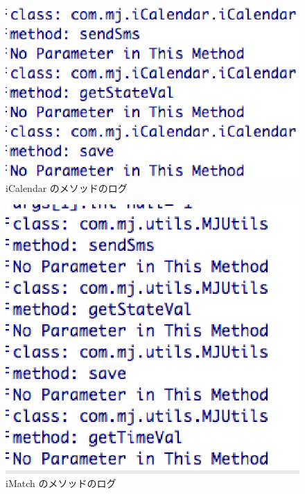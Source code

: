 \begin{figure}[t]
\begin{center}
\graphicspath{{./epsfiles/}}
\includegraphics[scale=0.45]{icalendar1.eps}
\end{center}
\caption{iCalendar のメソッドのログ}
\label{calendar}
\end{figure}

\begin{figure}[t]
\begin{center}
\graphicspath{{./epsfiles/}}
\includegraphics[scale=0.45]{imatch_sendsms.eps}
\end{center}
\caption{iMatch のメソッドのログ}
\label{imatch}
\end{figure}

